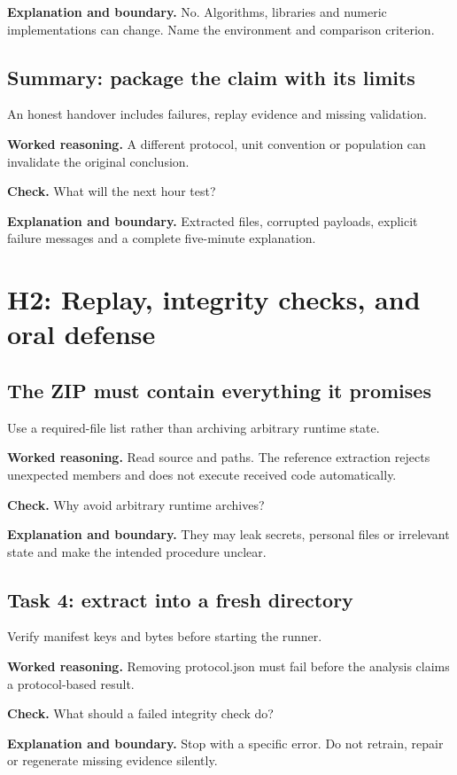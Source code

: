 \textbf{Explanation and boundary.} No. Algorithms, libraries and numeric implementations can change. Name the environment and comparison criterion.

\subsection{Summary: package the claim with its limits}
An honest handover includes failures, replay evidence and missing validation.

\textbf{Worked reasoning.} A different protocol, unit convention or population can invalidate the original conclusion.

\textbf{Check.} What will the next hour test?

\textbf{Explanation and boundary.} Extracted files, corrupted payloads, explicit failure messages and a complete five-minute explanation.

\section{H2: Replay, integrity checks, and oral defense}
\subsection{The ZIP must contain everything it promises}
Use a required-file list rather than archiving arbitrary runtime state.

\textbf{Worked reasoning.} Read source and paths. The reference extraction rejects unexpected members and does not execute received code automatically.

\textbf{Check.} Why avoid arbitrary runtime archives?

\textbf{Explanation and boundary.} They may leak secrets, personal files or irrelevant state and make the intended procedure unclear.

\subsection{Task 4: extract into a fresh directory}
Verify manifest keys and bytes before starting the runner.

\textbf{Worked reasoning.} Removing protocol.json must fail before the analysis claims a protocol-based result.

\textbf{Check.} What should a failed integrity check do?

\textbf{Explanation and boundary.} Stop with a specific error. Do not retrain, repair or regenerate missing evidence silently.

